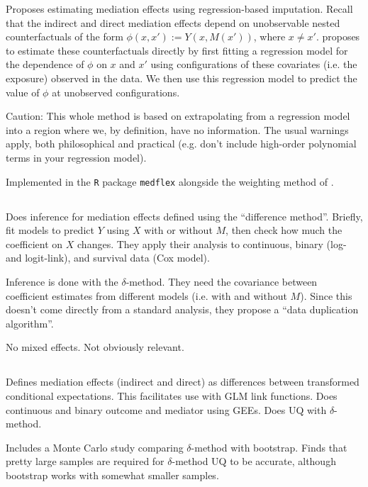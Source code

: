 \documentclass{report}
\begin{document}
Proposes estimating mediation effects using regression-based imputation. Recall that the indirect and direct mediation effects depend on unobservable nested counterfactuals of the form $\phi(x, x') := Y(x, M(x'))$, where $x \neq x'$. \citet{Van12} proposes to estimate these counterfactuals directly by first fitting a regression model for the dependence of $\phi$ on $x$ and $x'$ using configurations of these covariates (i.e. the exposure) observed in the data. We then use this regression model to predict the value of $\phi$ at unobserved configurations.

Caution: This whole method is based on extrapolating from a regression model into a region where we, by definition, have no information. The usual warnings apply, both philosophical and practical (e.g. don't include high-order polynomial terms in your regression model).

Implemented in the \texttt{R} package \texttt{medflex} \citep{Ste17} alongside the weighting method of \citet{Lan12}.

\subsection{\citet{Nev17}}

Does inference for mediation effects defined using the ``difference method''. Briefly, fit models to predict $Y$ using $X$ with or without $M$, then check how much the coefficient on $X$ changes. They apply their analysis to continuous, binary (log- and logit-link), and survival data (Cox model).

Inference is done with the $\delta$-method. They need the covariance between coefficient estimates from different models (i.e. with and without $M$). Since this doesn't come directly from a standard analysis, they propose a ``data duplication algorithm''.

No mixed effects. Not obviously relevant.


\subsection{\citet{Che21}}

Defines mediation effects (indirect and direct) as differences between transformed conditional expectations. This facilitates use with GLM link functions. Does continuous and binary outcome and mediator using GEEs. Does UQ with $\delta$-method. 

Includes a Monte Carlo study comparing $\delta$-method with bootstrap. Finds that pretty large samples are required for $\delta$-method UQ to be accurate, although bootstrap works with somewhat smaller samples.
\end{document}

